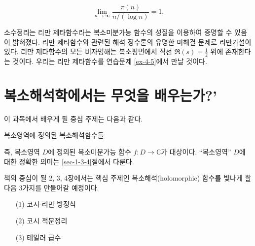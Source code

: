 \begin{itemize}
\begin{salttheorem}[소수정리]{}{} \label{thm-0-1}
$$
\lim_{n\to\infty} \frac{\pi(n)}{n/(\log n)} = 1.
$$
\end{salttheorem}

소수정리는 리만 제타함수라는 복소미분가능 함수의 성질을 이용하여 증명할 수 있음이 밝혀졌다.
리만 제타함수와 관련된 해석 정수론의 유명한 미해결 문제로 리만가설이 있다.
리만 제타함수의 모든 비자명해는 복소평면에서 직선 $\Re(s)=\frac12$ 위에 존재한다는 것이다.
우리는 리만 제타함수를 연습문제 \ref{ex-4-5}에서 만날 것이다.
\end{itemize}


\section*{복소해석학에서는 무엇을 배우는가?'}

이 과목에서 배우게 될 중심 주제는 다음과 같다.


\begin{tcolorbox}[breakable, colback = white, colframe = myblue, before=\par\smallskip, after=\par\smallskip]
\begin{center} 
복소영역에 정의된 복소해석함수들
\end{center}
\end{tcolorbox}

즉, 복소영역 $D$에 정의된 복소미분가능 함수 $f \colon D\to \mathbb C$가 대상이다.
``복소영역'' $D$에 대한 정확한 의미는 \ref{sec-1-3-4}절에서 다룬다.

책의 중심이 될 2, 3, 4장에서는
핵심 주제인 복소해석(holomorphic) 함수를 빛나게 할 다음 3가지를 만들어갈 예정이다.
\begin{enumerate}[itemsep=5pt, parsep=0pt]
\item[(1)] 코시-리만 방정식
\item[(2)] 코시 적분정리
\item[(3)] 테일러 급수
\end{enumerate}

